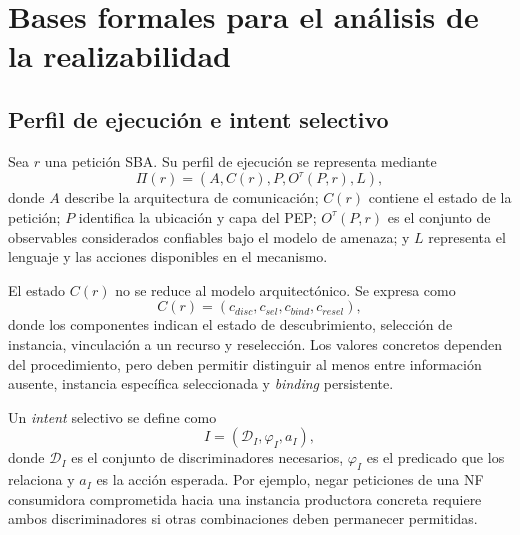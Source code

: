 \section{Bases formales para el análisis de la realizabilidad}
\label{sec:bases-formales}


\subsection{Perfil de ejecución e intent selectivo}
\label{subsec:perfil-ejecucion}

Sea $r$ una petición SBA. Su perfil de ejecución se representa mediante
\begin{equation}
    \Pi(r) = \left(A, C(r), P, O^{\tau}(P,r), L\right),
    \label{eq:perfil-ejecucion}
\end{equation}
%
donde $A$ describe la arquitectura de comunicación; $C(r)$ contiene el estado de la petición; $P$ identifica la ubicación y capa del PEP; $O^{\tau}(P,r)$ es el conjunto de observables considerados confiables bajo el modelo de amenaza; y $L$ representa el lenguaje y las acciones disponibles en el mecanismo.

El estado $C(r)$ no se reduce al modelo arquitectónico. Se expresa como
\begin{equation}
    C(r) = \left(c_{disc}, c_{sel}, c_{bind}, c_{resel}\right),
    \label{eq:estado-peticion}
\end{equation}
%
donde los componentes indican el estado de descubrimiento, selección de instancia, vinculación a un recurso y reselección. Los valores concretos dependen del procedimiento, pero deben permitir distinguir al menos entre información ausente, instancia específica seleccionada y \textit{binding} persistente.

Un \textit{intent} selectivo se define como
\begin{equation}
    I = \left(\mathcal{D}_{I}, \varphi_{I}, a_{I}\right),
    \label{eq:intent-selectivo}
\end{equation}
%
donde $\mathcal{D}_{I}$ es el conjunto de discriminadores necesarios, $\varphi_{I}$ es el predicado que los relaciona y $a_{I}$ es la acción esperada. Por ejemplo, negar peticiones de una NF consumidora comprometida hacia una instancia productora concreta requiere ambos discriminadores si otras combinaciones deben permanecer permitidas.


